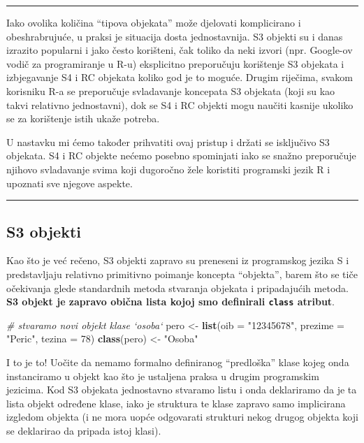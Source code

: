 \documentclass[]{book}
\newenvironment{Shaded}{\begin{snugshade}}{\end{snugshade}}
\newcommand{\KeywordTok}[1]{\textcolor[rgb]{0.13,0.29,0.53}{\textbf{#1}}}
\newcommand{\DataTypeTok}[1]{\textcolor[rgb]{0.13,0.29,0.53}{#1}}
\newcommand{\DecValTok}[1]{\textcolor[rgb]{0.00,0.00,0.81}{#1}}
\newcommand{\StringTok}[1]{\textcolor[rgb]{0.31,0.60,0.02}{#1}}
\newcommand{\CommentTok}[1]{\textcolor[rgb]{0.56,0.35,0.01}{\textit{#1}}}
\newcommand{\NormalTok}[1]{#1}
\theoremstyle{definition}
\theoremstyle{definition}
\theoremstyle{definition}
\theoremstyle{remark}
\begin{document}
\begin{center}\rule{0.5\linewidth}{\linethickness}\end{center}

Iako ovolika količina ``tipova objekata'' može djelovati komplicirano i
obeshrabrujuće, u praksi je situacija dosta jednostavnija. S3 objekti su
i danas izrazito popularni i jako često korišteni, čak toliko da neki
izvori (npr. Google-ov vodič za programiranje u R-u) eksplicitno
preporučuju korištenje S3 objekata i izbjegavanje S4 i RC objekata
koliko god je to moguće. Drugim riječima, svakom korisniku R-a se
preporučuje svladavanje koncepata S3 objekata (koji su kao takvi
relativno jednostavni), dok se S4 i RC objekti mogu naučiti kasnije
ukoliko se za korištenje istih ukaže potreba.

U nastavku mi ćemo također prihvatiti ovaj pristup i držati se
isključivo S3 objekata. S4 i RC objekte nećemo posebno spominjati iako
se snažno preporučuje njihovo svladavanje svima koji dugoročno žele
koristiti programski jezik R i upoznati sve njegove aspekte.

\begin{center}\rule{0.5\linewidth}{\linethickness}\end{center}

\subsection{S3 objekti}\label{s3-objekti}

Kao što je već rečeno, S3 objekti zapravo su preneseni iz programskog
jezika S i predstavljaju relativno primitivno poimanje koncepta
``objekta'', barem što se tiče očekivanja glede standardnih metoda
stvaranja objekata i pripadajućih metoda. \textbf{S3 objekt je zapravo
obična lista kojoj smo definirali \texttt{class} atribut}.

\begin{Shaded}
\begin{Highlighting}[]
\CommentTok{# stvaramo novi objekt klase `osoba`}
\NormalTok{pero <-}\StringTok{ }\KeywordTok{list}\NormalTok{(}\DataTypeTok{oib =} \StringTok{"12345678"}\NormalTok{, }\DataTypeTok{prezime =} \StringTok{"Peric"}\NormalTok{, }\DataTypeTok{tezina =} \DecValTok{78}\NormalTok{)}
\KeywordTok{class}\NormalTok{(pero) <-}\StringTok{ "Osoba"}
\end{Highlighting}
\end{Shaded}

I to je to! Uočite da nemamo formalno definiranog ``predloška'' klase
kojeg onda instanciramo u objekt kao što je ustaljena praksa u drugim
programskim jezicima. Kod S3 objekata jednostavno stvaramo listu i onda
deklariramo da je ta lista objekt određene klase, iako je struktura te
klase zapravo samo implicirana izgledom objekta (i ne mora uopće
odgovarati strukturi nekog drugog objekta koji se deklarirao da pripada
istoj klasi).
\end{document}
